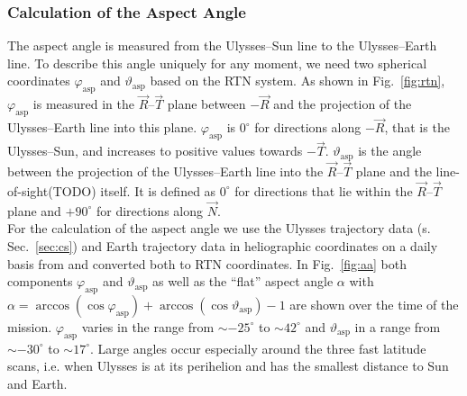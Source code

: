 \subsubsection{Calculation of the Aspect Angle}
The aspect angle is measured from the Ulysses--Sun line to the Ulysses--Earth line. To describe this angle uniquely for any moment, we need two spherical coordinates $\varphi_{\mathrm{asp}}$ and $\vartheta_{\mathrm{asp}}$ based on the RTN system. As shown in Fig.~\ref{fig:rtn}, $\varphi_{\mathrm{asp}}$ is measured in the $\vec{R}$--$\vec{T}$ plane between $-\vec{R}$ and the projection of the Ulysses--Earth line into this plane. $\varphi_{\mathrm{asp}}$  is $0^\circ$ for directions along $-\vec{R}$, that is the Ulysses--Sun, and increases to positive values towards $-\vec{T}$. $\vartheta_{\mathrm{asp}}$ is the angle between the projection of the Ulysses--Earth line into the $\vec{R}$--$\vec{T}$ plane and the line-of-sight(TODO) itself. It is defined as $0^\circ$ for directions that lie within the $\vec{R}$--$\vec{T}$ plane and $+90^\circ$ for directions along $\vec{N}$.\\
For the calculation of the aspect angle we use the Ulysses trajectory data (s. Sec.~\ref{sec:cs}) and Earth trajectory data in heliographic coordinates on a daily basis from \citet{nasa-earth-coord} and converted both to RTN coordinates. In Fig.~\ref{fig:aa} both components $\varphi_{\mathrm{asp}}$ and $\vartheta_{\mathrm{asp}}$ as well as the ``flat'' aspect angle $\alpha$ with  $\alpha = \arccos(\cos{\varphi_{\mathrm{asp}}}) + \arccos(\cos{\vartheta_{\mathrm{asp}}}) -1$ are shown over the time of the mission. $\varphi_{\mathrm{asp}}$ varies in the range from $\sim - 25^\circ$ to $\sim 42^\circ$ and $\vartheta_{\mathrm{asp}}$ in a range from $\sim - 30^\circ$ to $\sim 17^\circ$. Large angles occur especially around the three fast latitude scans, i.e. when Ulysses is at its perihelion and has the smallest distance to Sun and Earth.
